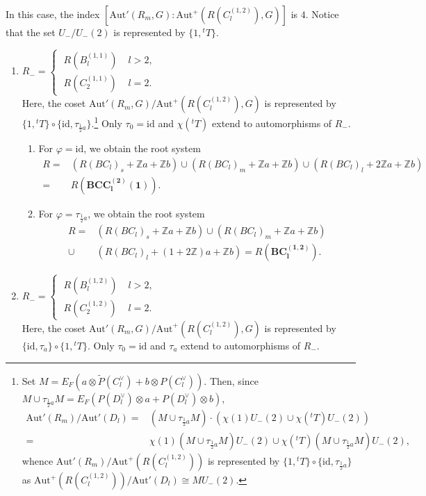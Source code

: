 \documentclass[11pt]{amsart}
\newcommand{\Z}{\mathbb{Z}}
\newcommand{\Aut}{\mathrm{Aut}}
\newcommand{\id}{\mathrm{id}}
\begin{document}
In this case, the index $[\Aut'(R_m,G):\Aut^+(R(C_l^{(1,2)}),G)]$ is $4$. Notice that the set 
$U_-/U_-(2)$ is represented by $\{ 1, {}^tT\}$.
\begin{enumerate}
\item[(I)] $R_-=\begin{cases}\; R(B_l^{(1,1)})\; &l>2, \\ \; R(C_2^{(1,1)})\; &l=2.\end{cases}$ \\ Here, the coset $\Aut'(R_m,G)/\Aut^+(R(C_l^{(1,2)}),G)$ is represented by 
$\{1, {}^tT \} \circ \{ \id, \tau_{\frac{1}{2}a} \}$.\footnote{Set $M=E_F( a\otimes \tilde{P}(C_l^\vee)+b\otimes P(C_l^\vee))$. Then, since $M \cup \tau_{\frac{1}{2}a}M=E_F(P(D_l^\vee)\otimes a+P(D_l^\vee)\otimes b)$, 
\begin{align*}
\Aut'(R_m)/\Aut'(D_l)=
&(M \cup \tau_{\frac{1}{2}a}M) \cdot (\chi(1)U_-(2) \cup \chi({}^tT)U_-(2)) \\
=
&\chi(1)(M\cup \tau_{\frac{1}{2}a}M)U_-(2)\cup \chi({}^tT)(M\cup \tau_{\frac{1}{2}a}M)U_-(2),
\end{align*}
whence $\Aut'(R_m)/\Aut^+(R(C_l^{(1,2)}))$ is represented by $\{1, {}^tT\}\circ \{\id, \tau_{\frac{1}{2}a}\}$ as $\Aut^+(R(C_l^{(1,2)}))/\Aut'(D_l)\cong MU_-(2)$.}
Only $\tau_0=\id$ and $\chi({}^tT)$ extend to automorphisms of $R_-$. 
\begin{enumerate}
\item[(i)] For $\varphi=\id$, we obtain the root system
\begin{align*}
R=
& (R(BC_l)_s+\Z a+\Z b)\cup (R(BC_l)_m+\Z a+\Z b) \cup (R(BC_l)_l+2\Z a+\Z b) \\ =
&R(\mathbf{BCC_l^{(2)}(1)}). 
\end{align*}
\item[(ii)] For $\varphi=\tau_{\frac{1}{2}a}$, we obtain the root system
\begin{align*}
R=
& (R(BC_l)_s+\Z a+\Z b)\cup (R(BC_l)_m+\Z a+\Z b) \\
\cup 
&(R(BC_l)_l+(1+2\Z) a+\Z b) 
= R(\mathbf{BC_l^{(1,2)}}).
\end{align*}
\end{enumerate}
\item[(II)] $R_-=\begin{cases}\; R(B_l^{(1,2)})\; &l>2, \\ \; R(C_2^{(1,2)})\; &l=2.\end{cases}$ \\
Here, the coset $\Aut'(R_m,G)/\Aut^+(R(C_l^{(1,2)}),G)$ is represented by $\{ \id, \tau_{a} \} \circ \{1, {}^tT \}$. Only $\tau_0=\id$ and $\tau_a$ extend to automorphisms of $R_-$.

\end{enumerate}
\end{document}
